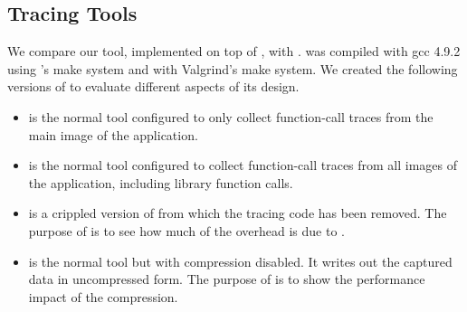 \subsection{Tracing Tools}
\label{sec:tracing-tools}

We compare our \parlot tool, implemented on top of , with .
%
\parlot was compiled with gcc 4.9.2 using \pin 's make system and \callgrind with Valgrind's make system.
%
We created the following versions of \parlot to evaluate different aspects of its design.


\begin{itemize}
\item \textbf{\parlotm} is the normal \parlot tool configured to only collect function-call traces from the main image of the application.
\item \textbf{\parlota} is the normal \parlot tool configured to collect function-call traces from all images of the application, including library function calls.
\item \textbf{\pininit} is a crippled version of \parlot from which the tracing code has been removed.
%
The purpose of \pininit is to see how much of the overhead is due to \pin.
\item \textbf{\parlotnc} is the normal \parlot tool but with compression disabled.
%
It writes out the captured data in uncompressed form.
%
The purpose of \parlotnc is to show the performance impact of the compression.
\end{itemize}


